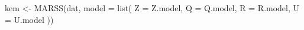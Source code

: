 \begin{Schunk}
\begin{Sinput}
 kem <- MARSS(dat, model = list(
   Z = Z.model,
   Q = Q.model, R = R.model, U = U.model
 ))
\end{Sinput}
\end{Schunk}

